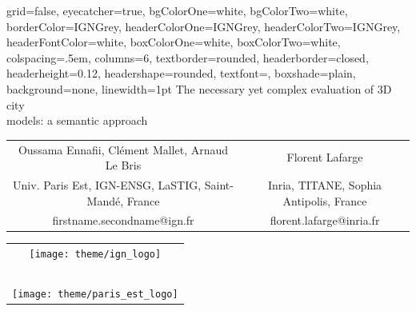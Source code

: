 \documentclass[portrait, a0paper, margin=.5cm]{baposter}
\begin{document}
    \begin{poster}%
    {
        grid=false,
        eyecatcher=true,
        bgColorOne=white,
        bgColorTwo=white,
        borderColor=IGNGrey,
        headerColorOne=IGNGrey,
        headerColorTwo=IGNGrey,
        headerFontColor=white,
        boxColorOne=white,
        boxColorTwo=white,
        colspacing=.5em,
        columns=6,
        textborder=rounded,
        headerborder=closed,
        headerheight=0.12\textheight,
        headershape=rounded,
        textfont={\color{IGNDarkGrey}},
        boxshade=plain,
        background=none,
        linewidth=1pt
    }
    {}
    {
        \color{IGNDarkGrey}
        The necessary yet complex evaluation of 3D city\\models: a semantic approach
    }
    {
        \vspace{.5cm}
        \color{IGNDarkGrey}
        \begin{tabular}{c c}
            \small Oussama Ennafii, Clément Mallet, Arnaud Le Bris & \small Florent Lafarge\\
            \small Univ. Paris Est, IGN-ENSG, LaSTIG, Saint-Mandé, France & \small Inria, TITANE, Sophia Antipolis, France\\
            \small firstname.secondname@ign.fr & \small florent.lafarge@inria.fr
        \end{tabular}
    }
    {
        \begin{tabular}{c}
            \texttt{[image: theme/ign\_logo]}\\~\\
            \texttt{[image: theme/paris\_est\_logo]}
        \end{tabular}
    }



\end{poster}
\end{document}
